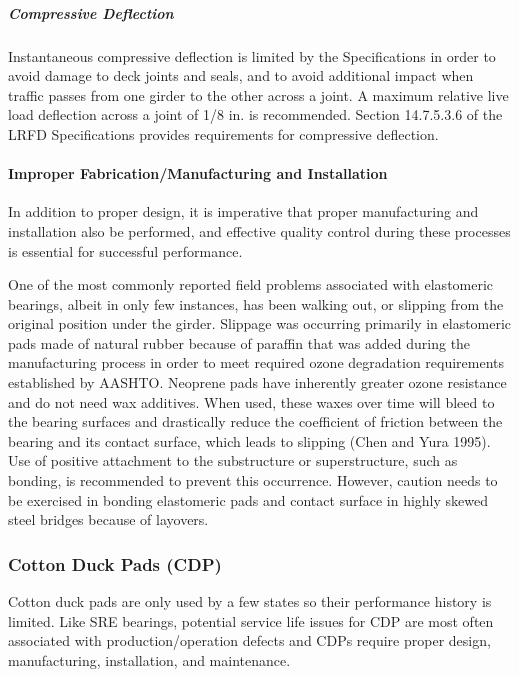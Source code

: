 \subparagraph{Compressive Deflection}

Instantaneous compressive deflection is limited by the Specifications in order to avoid damage to deck joints and
seals, and to avoid additional impact when traffic passes from one girder to the other across a joint. A maximum
relative live load deflection across a joint of 1/8 in. is recommended. Section 14.7.5.3.6 of the LRFD Specifications
provides requirements for compressive deflection.

\paragraph{Improper Fabrication/Manufacturing and Installation}
In addition to proper design, it is imperative that proper manufacturing and installation also be performed, and
effective quality control during these processes is essential for successful performance.

One of the most commonly reported field problems associated with elastomeric bearings, albeit in only few
instances, has been walking out, or slipping from the original position under the girder. Slippage was occurring
primarily in elastomeric pads made of natural rubber because of paraffin that was added during the manufacturing
process in order to meet required ozone degradation requirements established by AASHTO. Neoprene pads have
inherently greater ozone resistance and do not need wax additives. When used, these waxes over time will bleed to
the bearing surfaces and drastically reduce the coefficient of friction between the bearing and its contact surface,
which leads to slipping (Chen and Yura 1995). Use of positive attachment to the substructure or superstructure, such
as bonding, is recommended to prevent this occurrence. However, caution needs to be exercised in bonding
elastomeric pads and contact surface in highly skewed steel bridges because of layovers.

\subsubsection{Cotton Duck Pads (CDP)}
Cotton duck pads are only used by a few states so their performance history is limited. Like SRE bearings,
potential service life issues for CDP are most often associated with production/operation defects and CDPs require
proper design, manufacturing, installation, and maintenance.

